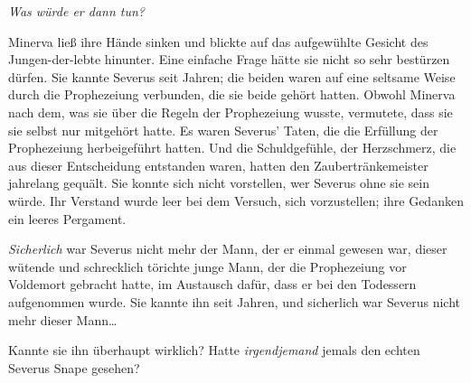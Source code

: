 \later

\emph{Was würde er dann tun?}

Minerva ließ ihre Hände sinken und blickte auf das aufgewühlte Gesicht des Jungen-der-lebte hinunter. Eine einfache Frage hätte sie nicht so sehr bestürzen dürfen. Sie kannte Severus seit Jahren; die beiden waren auf eine seltsame Weise durch die Prophezeiung verbunden, die sie beide gehört hatten. Obwohl Minerva nach dem, was sie über die Regeln der Prophezeiung wusste, vermutete, dass sie sie selbst nur mitgehört hatte. Es waren Severus' Taten, die die Erfüllung der Prophezeiung herbeigeführt hatten. Und die Schuldgefühle, der Herzschmerz, die aus dieser Entscheidung entstanden waren, hatten den Zaubertränkemeister jahrelang gequält. Sie konnte sich nicht vorstellen, wer Severus ohne sie sein würde. Ihr Verstand wurde leer bei dem Versuch, sich vorzustellen; ihre Gedanken ein leeres Pergament.

\emph{Sicherlich} war Severus nicht mehr der Mann, der er einmal gewesen war, dieser wütende und schrecklich törichte junge Mann, der die Prophezeiung vor Voldemort gebracht hatte, im Austausch dafür, dass er bei den Todessern aufgenommen wurde.
Sie kannte ihn seit Jahren, und sicherlich war Severus nicht mehr dieser Mann…


Kannte sie ihn überhaupt wirklich? Hatte \emph{irgendjemand} jemals den echten Severus Snape gesehen?

\later

